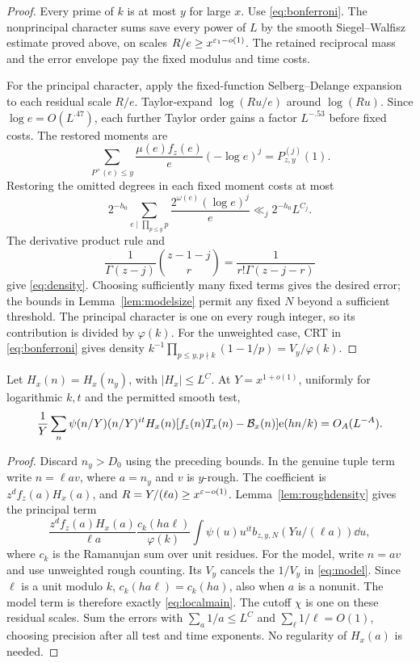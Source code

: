 \begin{proof}
Every prime of $k$ is at most $y$ for large $x$.
Use \eqref{eq:bonferroni}. The nonprincipal character sums save
every power of $L$ by the smooth Siegel--Walfisz estimate proved
above, on scales $R/e\geq x^{\varepsilon_1-o(1)}$.
The retained reciprocal mass and the error envelope pay the fixed
modulus and time costs.

For the principal character, apply the fixed-function
Selberg--Delange expansion to each residual scale $R/e$.
Taylor-expand $\log(Ru/e)$ around $\log(Ru)$. Since
$\log e=O(L^{.47})$, each further Taylor order gains a factor
$L^{-.53}$ before fixed costs. The restored moments are
\[
 \sum_{P^+(e)\leq y}\frac{\mu(e)f_z(e)}e(-\log e)^j
       =P_{z,y}^{(j)}(1).
\]
Restoring the omitted degrees in each fixed moment costs at most
\[
 2^{-h_0}\sum_{e\mid\prod_{p\leq y}p}
       \frac{2^{\omega(e)}(\log e)^j}{e}
 \ll_j 2^{-h_0}L^{C_j}.
\]
The derivative product rule and
\[
 \frac1{\Gamma(z-j)}\binom{z-1-j}{r}
       =\frac1{r!\Gamma(z-j-r)}
\]
give \eqref{eq:density}. Choosing sufficiently many fixed terms
gives the desired error; the bounds in Lemma~\ref{lem:modelsize}
permit any fixed $N$ beyond a sufficient threshold.
The principal character is one on every rough integer, so its
contribution is divided by $\varphi(k)$.
For the unweighted case, CRT in \eqref{eq:bonferroni} gives density
$k^{-1}\prod_{p\leq y,p\nmid k}(1-1/p)=V_y/\varphi(k)$.
\end{proof}

\begin{lemma}\label{lem:localmatch}
Let $H_x(n)=H_x(n_y)$, with $|H_x|\leq L^C$. At $Y=x^{1+o(1)}$,
uniformly for logarithmic $k,t$ and the permitted smooth test,
\begin{equation}\label{eq:localmatch}
 \frac1Y\sum_n\psi(n/Y)(n/Y)^{it}H_x(n)
       [f_z(n)T_x(n)-\mathcal B_x(n)]\mathrm e(hn/k)=O_A(L^{-A}).
\end{equation}
\end{lemma}

\begin{proof}
Discard $n_y>D_0$ using the preceding bounds. In the genuine tuple
term write $n=\ell av$, where $a=n_y$ and $v$ is $y$-rough.
The coefficient is $z^df_z(a)H_x(a)$, and
$R=Y/(\ell a)\geq x^{\varepsilon-o(1)}$. Lemma~\ref{lem:roughdensity}
gives the principal term
\begin{equation}\label{eq:localmain}
 \frac{z^df_z(a)H_x(a)}{\ell a}
 \frac{c_k(ha\ell)}{\varphi(k)}
 \int\psi(u)u^{it}b_{z,y,N}(Yu/(\ell a))\dd u,
\end{equation}
where $c_k$ is the Ramanujan sum over unit residues.
For the model, write $n=av$ and use unweighted rough counting.
Its $V_y$ cancels the $1/V_y$ in \eqref{eq:model}.
Since $\ell$ is a unit modulo $k$, $c_k(ha\ell)=c_k(ha)$, also
when $a$ is a nonunit. The model term is therefore exactly
\eqref{eq:localmain}. The cutoff $\chi$ is one on these residual
scales. Sum the errors with $\sum_a1/a\leq L^C$ and
$\sum_{\boldsymbol\ell}1/\ell=O(1)$, choosing precision after all
test and time exponents. No regularity of $H_x(a)$ is needed.
\end{proof}

